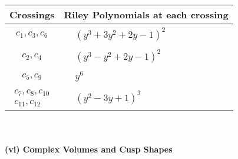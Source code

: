 \documentclass[1p]{elsarticle_modified}
\theoremstyle{definition}
\begin{document}
\begin{tabular}{m{50pt}|m{274pt}}
Crossings & \hspace{64pt}Riley Polynomials at each crossing \\
\hline $$\begin{aligned}c_{1},c_{3},c_{6}\end{aligned}$$&$\begin{aligned}
&(y^3+3 y^2+2 y-1)^2
\end{aligned}$\\
\hline $$\begin{aligned}c_{2},c_{4}\end{aligned}$$&$\begin{aligned}
&(y^3- y^2+2 y-1)^2
\end{aligned}$\\
\hline $$\begin{aligned}c_{5},c_{9}\end{aligned}$$&$\begin{aligned}
&y^6
\end{aligned}$\\
\hline $$\begin{aligned}c_{7},c_{8},c_{10}\\c_{11},c_{12}\end{aligned}$$&$\begin{aligned}
&(y^2-3 y+1)^3
\end{aligned}$\\
\hline
\end{tabular}\\~\\
\newpage\flushleft \textbf{(vi) Complex Volumes and Cusp Shapes}
\end{document}
